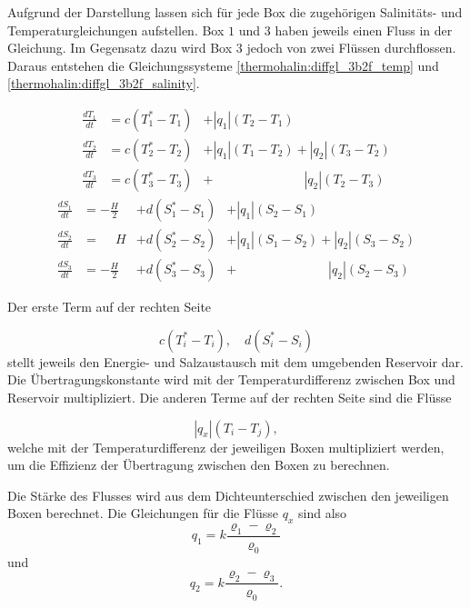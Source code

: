 Aufgrund der Darstellung lassen sich für jede Box die zugehörigen Salinitäts- und Temperaturgleichungen aufstellen. Box $1$ und $3$ haben jeweils einen Fluss in der Gleichung. Im Gegensatz dazu wird Box $3$ jedoch von zwei Flüssen durchflossen. Daraus entstehen die Gleichungssysteme \ref{thermohalin:diffgl_3b2f_temp} und \ref{thermohalin:diffgl_3b2f_salinity}. 

\begin{equation}\label{thermohalin:diffgl_3b2f_temp}
\begin{aligned}
\frac{dT_1}{dt} &= c(T_1^*-T_1)&+|q_1|(T_2-T_1)\phantom{+|q_2|(T_3-T_2)}
\\
\frac{dT_2}{dt} &= c(T_2^*-T_2)&+|q_1|(T_1-T_2)+|q_2|(T_3-T_2)
\\
\frac{dT_3}{dt} &= c(T_3^*-T_3)&+ \phantom{+|q_1|(T_1-T_2)}|q_2|(T_2-T_3)
\end{aligned}
\end{equation}
\begin{equation}\label{thermohalin:diffgl_3b2f_salinity}
\begin{aligned}
\frac{dS_1}{dt} &= -\frac{H}{2} &+ d(S_1^*-S_1)&+|q_1|(S_2-S_1)\phantom{+|q_2|(S_3-S_2)}
\\
\frac{dS_2}{dt} &= \phantom{-}H &+ d(S_2^*-S_2)&+|q_1|(S_1-S_2)+|q_2|(S_3-S_2)	
\\
\frac{dS_3}{dt} &= -\frac{H}{2} &+d(S_3^*-S_3)&+ \phantom{+|q_1|(S_1-S_2)}|q_2|(S_2-S_3)
\end{aligned}
\end{equation}	

Der erste Term auf der rechten Seite

\begin{equation*}
	c(T_i^*-T_i), \quad d(S_i^*-S_i)
\end{equation*}
stellt jeweils den Energie- und Salzaustausch mit dem umgebenden Reservoir dar. Die Übertragungskonstante wird mit der Temperaturdifferenz zwischen Box und Reservoir multipliziert. Die anderen Terme auf der rechten Seite sind die Flüsse

\begin{equation*}
	|q_x|(T_i-T_j),
\end{equation*}
welche mit der Temperaturdifferenz der jeweiligen Boxen multipliziert werden, um die Effizienz der Übertragung zwischen den Boxen zu berechnen.  


Die Stärke des Flusses wird aus dem Dichteunterschied zwischen den jeweiligen Boxen berechnet. 
Die Gleichungen für die Flüsse $q_x$ sind also 
\begin{equation}
	q_1 = k\frac{\varrho_1-\varrho_2}{\varrho_0}
\end{equation}
und 
\begin{equation}
q_2 = k\frac{\varrho_2-\varrho_3}{\varrho_0}.
\end{equation}

